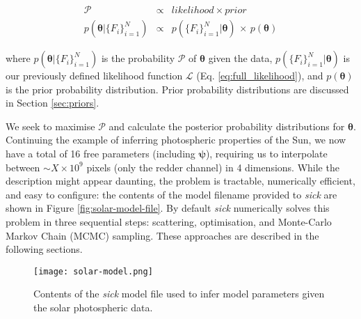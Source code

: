 \documentclass{aastex}
\newcommand{\sick}{\textit{sick}}
\begin{document}
\begin{eqnarray}
\mathcal{P} & \propto & likelihood \times prior \nonumber \\
p(\bm{\theta}|\{F_i\}_{i=1}^{N}) & \propto & p(\{F_i\}_{i=1}^{N}|\bm{\theta})\,\times\,p(\bm{\theta})
\label{eq:probability}
\end{eqnarray}

\noindent{}where $p(\bm{\theta}|\{F_i\}_{i=1}^{N})$ is the probability $\mathcal{P}$ of $\bm{\theta}$ given the data, $p(\{F_i\}_{i=1}^{N}|\bm{\theta})$ is our previously defined likelihood function $\mathcal{L}$ (Eq. \ref{eq:full_likelihood}), and $p(\bm{\theta})$ is the prior probability distribution. Prior probability distributions are discussed in Section \ref{sec:priors}.


We seek to maximise $\mathcal{P}$ and calculate the posterior probability distributions for $\bm{\theta}$. Continuing the example of inferring photospheric properties of the Sun, we now have a total of 16 free parameters (including $\bm{\psi}$), requiring us to interpolate between $\sim{}X\times10^{9}$ pixels (only the redder channel) in 4 dimensions. While the description might appear daunting, the problem is tractable, numerically efficient, and easy to configure: the contents of the model filename provided to \sick{} are shown in Figure \ref{fig:solar-model-file}. By default \sick{} numerically solves this problem in three sequential steps: scattering, optimisation, and Monte-Carlo Markov Chain (MCMC) sampling. These approaches are described in the following sections. 

\begin{figure}
\texttt{[image: solar-model.png]}
\caption{Contents of the \sick{} model file used to infer model parameters given the solar photospheric data.}
\end{figure}
\end{document}
